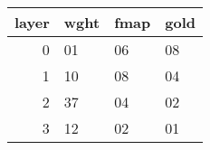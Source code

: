 \begin{tabular}{rlll}
\toprule
 layer & wght & fmap & gold \\
\midrule
     0 &   01 &   06 &   08 \\
     1 &   10 &   08 &   04 \\
     2 &   37 &   04 &   02 \\
     3 &   12 &   02 &   01 \\
\bottomrule
\end{tabular}
